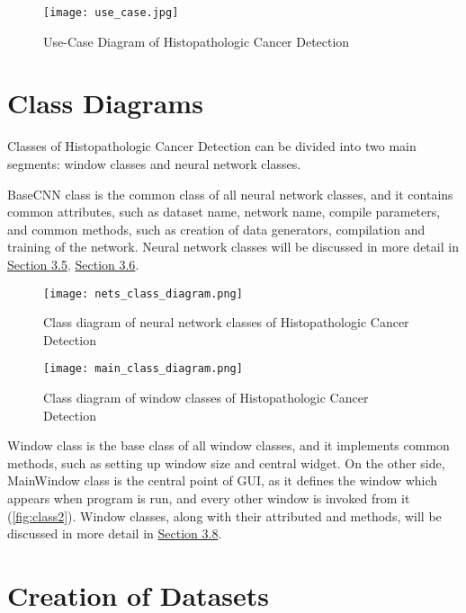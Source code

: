 \begin{figure}[h]
	\centering
	\texttt{[image: use\_case.jpg]}
	\caption{Use-Case Diagram of Histopathologic Cancer Detection}
	\label{fig:usecase}
\end{figure}

\section{Class Diagrams}

Classes of Histopathologic Cancer Detection can be divided into two main segments: window classes and neural network classes.

BaseCNN class is the common class of all neural network classes, and it contains common attributes, such as dataset name, network name, compile parameters, and common methods, such as creation of data generators, compilation and training of the network. Neural network classes will be discussed in more detail in \textcolor{red}{\hyperref[cnn]{Section 3.5}, \hyperref[vgg19]{Section 3.6}}.

\begin{figure}[h]
	\centering
	\texttt{[image: nets\_class\_diagram.png]}
	\caption{Class diagram of neural network classes of Histopathologic Cancer Detection}
	\label{fig:class1}
\end{figure}

\begin{figure}
	\centering
	\texttt{[image: main\_class\_diagram.png]}
	\caption{Class diagram of window classes of Histopathologic Cancer Detection}
	\label{fig:class2}
\end{figure}

Window class is the base class of all window classes, and it implements common methods, such as setting up window size and central widget. On the other side, MainWindow class is the central point of GUI, as it defines the window which appears when program is run, and every other window is invoked from it (\textcolor{red}{\autoref{fig:class2}}). Window classes, along with their attributed and methods, will be discussed in more detail in \textcolor{red}{\hyperref[gui]{Section 3.8}}.

\section{Creation of Datasets}
\label{createdata}

